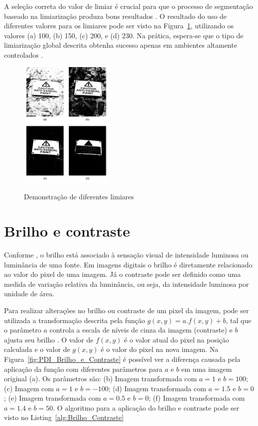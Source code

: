 \documentclass[12pt,oneside,a4paper,english,french,spanish,brazil,]{abntex2}
\begin{document}
A seleção correta do valor de limiar é crucial para que o processo de segmentação baseado na limiarização produza bons resultados \cite{pedrini:2008}. O resultado do uso de diferentes valores para os limiares pode ser visto na Figura~\ref{fig:PDI_Limiarizacao_2}, utilizando os valores (a) 100, (b) 150, (c) 200, e (d) 230. Na prática, espera-se que o tipo de limiarização global descrita obtenha sucesso apenas em ambientes altamente controlados \cite{gonzalez:2012}.

\begin{figure}[ht]
\centering
\caption{Demonstração de diferentes limiares}
\includegraphics[width=0.4\textwidth]{imagens/PDI_Limiarizacao_2.pdf}
\sourceAuthor
\label{fig:PDI_Limiarizacao_2}
\end{figure}

\section{Brilho e contraste}

Conforme \citet{pedrini:2008}, o brilho está associado à sensação visual de intensidade luminosa ou luminância de uma fonte. Em imagens digitais o brilho é diretamente relacionado ao valor do pixel de uma imagem. Já o contraste pode ser definido como uma medida de variação relativa da luminância, ou seja, da intensidade luminosa por unidade de área.

Para realizar alterações no brilho ou contraste de um pixel da imagem, pode ser utilizada a transformação descrita pela função \(g(x,y)=a.f(x,y)+b\), tal que o parâmetro \(a\) controla a escala de níveis de cinza da imagem (contraste) e \(b\) ajusta seu brilho \cite{pedrini:2008}. O valor de \(f(x,y)\) é o valor atual do pixel na posição calculada e o valor de \(g(x,y)\) é o valor do pixel na nova imagem. Na Figura~\ref{fig:PDI_Brilho_e_Contraste} é possível ver a diferença causada pela aplicação da função com diferentes parâmetros para \(a\) e \(b\) em uma imagem original (a). Os parâmetros são: (b) Imagem transformada com \(a=1\) e \(b=100\); (c) Imagem com \(a=1\) e \(b=-100\); (d) Imagem transformada com \(a=1.5\) e \(b=0\); (e) Imagem transformada com \(a=0.5\) e \(b=0\); (f) Imagem transformada com \(a=1.4\) e \(b=50\). O algoritmo para a aplicação do brilho e contraste pode ser visto no Listing~\ref{alg:Brilho_Contraste} 
\end{document}
